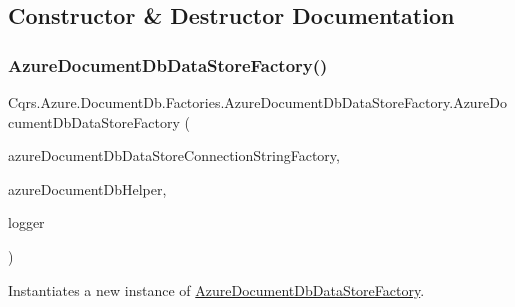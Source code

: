 \subsection{Constructor \& Destructor Documentation}
\mbox{\label{classCqrs_1_1Azure_1_1DocumentDb_1_1Factories_1_1AzureDocumentDbDataStoreFactory_a7bafe0acfcbb5eaacb5cd2714c39fa08_a7bafe0acfcbb5eaacb5cd2714c39fa08}} 
\subsubsection{\texorpdfstring{Azure\+Document\+Db\+Data\+Store\+Factory()}{AzureDocumentDbDataStoreFactory()}}
{\footnotesize\ttfamily Cqrs.\+Azure.\+Document\+Db.\+Factories.\+Azure\+Document\+Db\+Data\+Store\+Factory.\+Azure\+Document\+Db\+Data\+Store\+Factory (\begin{DoxyParamCaption}\item[{\hyperlink{interfaceCqrs_1_1Azure_1_1DocumentDb_1_1Factories_1_1IAzureDocumentDbDataStoreConnectionStringFactory}{I\+Azure\+Document\+Db\+Data\+Store\+Connection\+String\+Factory}}]{azure\+Document\+Db\+Data\+Store\+Connection\+String\+Factory,  }\item[{\hyperlink{interfaceCqrs_1_1Azure_1_1DocumentDb_1_1IAzureDocumentDbHelper}{I\+Azure\+Document\+Db\+Helper}}]{azure\+Document\+Db\+Helper,  }\item[{I\+Logger}]{logger }\end{DoxyParamCaption})}



Instantiates a new instance of \hyperlink{classCqrs_1_1Azure_1_1DocumentDb_1_1Factories_1_1AzureDocumentDbDataStoreFactory}{Azure\+Document\+Db\+Data\+Store\+Factory}. 



